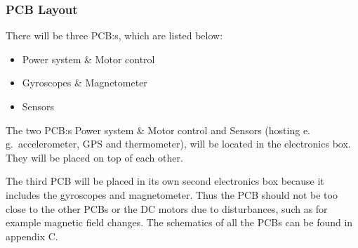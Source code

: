 \subsubsection{PCB Layout}
There will be three PCB:s, which are listed below:

\begin{itemize}
	\item 	Power system \& Motor control
	\item	Gyroscopes \& Magnetometer
	\item 	Sensors
\end{itemize}

The two PCB:s Power system \& Motor control  and Sensors (hosting e.\,g.~accelerometer, GPS and thermometer), will be located in the electronics box. They will be placed on top of each other. %



The third PCB will be placed in its own second electronics box because it includes the gyroscopes and magnetometer. Thus the PCB should not be too close to the other PCBs or the DC motors due to disturbances, such as for example magnetic field changes. The schematics of all the PCBs can be found in appendix C.
\raggedbottom
